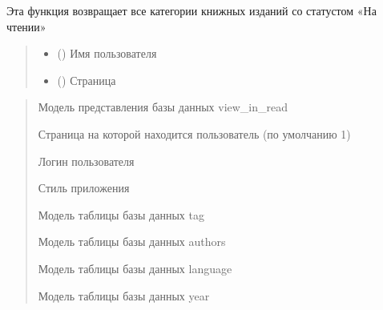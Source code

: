 \documentclass[letterpaper,10pt,russian]{sphinxmanual}
\begin{document}
\begin{fulllineitems}
\label{\detokenize{blueprints:blueprints.select_books_state.on_reading}}
\pysigstartsignatures
{}
\pysigstopsignatures
\sphinxAtStartPar
Эта функция возвращает все категории книжных изданий со статустом «На чтении»
\begin{quote}\begin{description}
\begin{itemize}
\item {} 
\sphinxAtStartPar
{} () \textendash{} Имя пользователя

\item {} 
\sphinxAtStartPar
{} () \textendash{} Страница

\end{itemize}

\end{description}\end{quote}
\begin{description}
\begin{quote}\begin{description}
\sphinxAtStartPar
Модель представления базы данных view\_in\_read

\sphinxAtStartPar
Страница на которой находится пользователь (по умолчанию 1)

\sphinxAtStartPar
Логин пользователя

\sphinxAtStartPar
Стиль приложения

\sphinxAtStartPar
Модель таблицы базы данных tag

\sphinxAtStartPar
Модель таблицы базы данных authors

\sphinxAtStartPar
Модель таблицы базы данных language

\sphinxAtStartPar
Модель таблицы базы данных year


\end{description}
\end{quote}
\end{description}
\end{fulllineitems}
\end{document}
